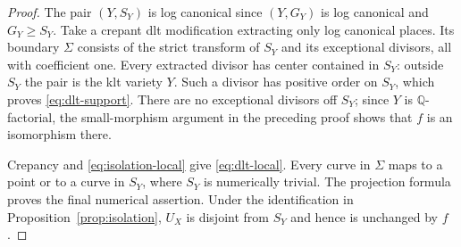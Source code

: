\begin{proof}
The pair $(Y,S_Y)$ is log canonical since $(Y,G_Y)$ is log canonical
and $G_Y\geq S_Y$.  Take a crepant dlt modification extracting only
log canonical places.  Its boundary $\Sigma$ consists of the strict
transform of $S_Y$ and its exceptional divisors, all with coefficient
one.  Every extracted divisor has center contained in $S_Y$:
outside $S_Y$ the pair is the klt variety $Y$.  Such a divisor has
positive order on $S_Y$, which proves \eqref{eq:dlt-support}.
There are no exceptional divisors off $S_Y$; since $Y$ is
$\mathbb Q$-factorial, the small-morphism argument in the preceding
proof shows that $f$ is an isomorphism there.

Crepancy and \eqref{eq:isolation-local} give
\eqref{eq:dlt-local}.  Every curve in $\Sigma$ maps to a point or to
a curve in $S_Y$, where $S_Y$ is numerically trivial.  The projection
formula proves the final numerical assertion.  Under the
identification in Proposition~\ref{prop:isolation}, $U_X$ is
disjoint from $S_Y$ and hence is unchanged by $f$.
\end{proof}

